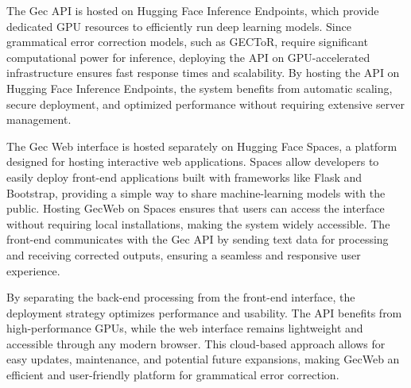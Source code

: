 The Gec API is hosted on Hugging Face Inference Endpoints, which provide dedicated GPU resources to efficiently run deep learning models.
Since grammatical error correction models, such as GECToR, require significant computational power for inference, deploying the API on GPU-accelerated infrastructure ensures fast response times and scalability.
By hosting the API on Hugging Face Inference Endpoints, the system benefits from automatic scaling, secure deployment, and optimized performance without requiring extensive server management.

The Gec Web interface is hosted separately on Hugging Face Spaces, a platform designed for hosting interactive web applications.
Spaces allow developers to easily deploy front-end applications built with frameworks like Flask and Bootstrap, providing a simple way to share machine-learning models with the public.
Hosting GecWeb on Spaces ensures that users can access the interface without requiring local installations, making the system widely accessible.
The front-end communicates with the Gec API by sending text data for processing and receiving corrected outputs, ensuring a seamless and responsive user experience.

By separating the back-end processing from the front-end interface, the deployment strategy optimizes performance and usability.
The API benefits from high-performance GPUs, while the web interface remains lightweight and accessible through any modern browser.
This cloud-based approach allows for easy updates, maintenance, and potential future expansions, making GecWeb an efficient and user-friendly platform for grammatical error correction.

